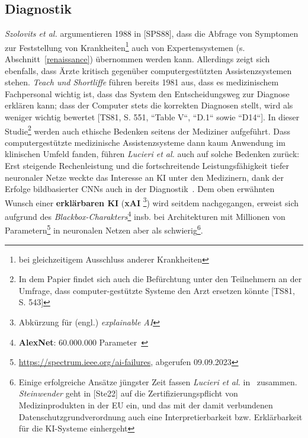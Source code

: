 \subsection{Diagnostik}
\textit{Szolovits et al.} argumentieren 1988 in [SPS88], dass die Abfrage von Symptomen zur Feststellung von Krankheiten\footnote{
    bei gleichzeitigem Ausschluss anderer Krankheiten
} auch von Expertensystemen (s. Abschnitt~\ref{renaissance}) übernommen werden kann. Allerdings zeigt sich ebenfalls, dass Ärzte kritisch gegenüber computergestützten Assistenzsystemen stehen. \textit{Teach und Shortliffe} führen bereits 1981 aus, dass es medizinischem Fachpersonal wichtig ist, dass das System den Entscheidungsweg zur Diagnose erklären kann; dass der Computer stets die korrekten Diagnosen stellt, wird als weniger wichtig bewertet [TS81, S. 551, ``Table V``, ``D.1`` sowie ``D14``]. In dieser Studie\footnote{
    In dem Papier findet sich auch die Befürchtung unter den Teilnehmern an der Umfrage, dass computer-gestützte Systeme den Arzt ersetzen könnte [TS81, S. 543]
} werden auch ethische Bedenken seitens der Mediziner aufgeführt. Dass computergestützte medizinische Assistenzsysteme dann kaum Anwendung im klinischen Umfeld fanden, führen \textit{Lucieri et al.} auch auf solche Bedenken zurück: Erst steigende Rechenleistung und die fortschreitende Leistungsfähigkeit tiefer neuronaler Netze weckte das Interesse an KI unter den Medizinern, dank der Erfolge bildbasierter CNNs auch in der Diagnostik~\cite[728]{LBDA22}. Dem oben erwähnten Wunsch einer \textbf{erklärbaren KI} (\textbf{xAI} \footnote{
    Abkürzung für (engl.) \textit{explainable AI}
}) wird seitdem nachgegangen, erweist sich aufgrund des \textit{Blackbox-Charakters}\footnote{
    \textbf{AlexNet}: 60.000.000 Parameter~\cite[1]{KSH12}
} insb. bei Architekturen mit Millionen von Parametern\footnote{
    \url{https://spectrum.ieee.org/ai-failures}, abgerufen 09.09.2023
} in neuronalen Netzen aber als schwierig\footnote{
    Einige erfolgreiche Ansätze jüngster Zeit fassen \textit{Lucieri et al.} in~\cite[733 ff]{LBDA22} zusammen. \textit{Steinwender} geht in [Ste22] auf die Zertifizierungspflicht von Medizinprodukten in der EU ein, und das mit der damit verbundenen Datenschutzgrundverordnung auch eine Interpretierbarkeit bzw. Erklärbarkeit für die KI-Systeme einhergeht
}.
